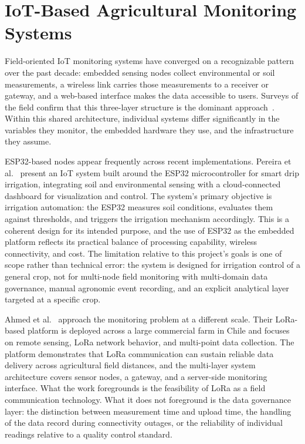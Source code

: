 \section{IoT-Based Agricultural Monitoring Systems}
\label{sec:iot-monitoring-systems}

Field-oriented IoT monitoring systems have converged on a recognizable pattern
over the past decade: embedded sensing nodes collect environmental or soil
measurements, a wireless link carries those measurements to a receiver or
gateway, and a web-based interface makes the data accessible to users.
Surveys of the field confirm that this three-layer structure is the dominant
approach~\cite{ayaz2019iot_smart_agriculture_survey,farooq2019iot_smart_agriculture_review}.
Within this shared architecture, individual systems differ significantly in
the variables they monitor, the embedded hardware they use, and the
infrastructure they assume.

ESP32-based nodes appear frequently across recent implementations. Pereira et
al.~\cite{pereira2023esp32_drip_irrigation} present an IoT system built around
the ESP32 microcontroller for smart drip irrigation, integrating soil and
environmental sensing with a cloud-connected dashboard for visualization and
control. The system's primary objective is irrigation automation: the ESP32
measures soil conditions, evaluates them against thresholds, and triggers the
irrigation mechanism accordingly. This is a coherent design for its intended
purpose, and the use of ESP32 as the embedded platform reflects its practical
balance of processing capability, wireless connectivity, and cost. The
limitation relative to this project's goals is one of scope rather than
technical error: the system is designed for irrigation control of a general
crop, not for multi-node field monitoring with multi-domain data governance,
manual agronomic event recording, and an explicit analytical layer targeted at
a specific crop.

Ahmed et al.~\cite{ahmed2022lora_agriculture_chile} approach the monitoring
problem at a different scale. Their LoRa-based platform is deployed across a
large commercial farm in Chile and focuses on remote sensing, LoRa network
behavior, and multi-point data collection. The platform demonstrates that LoRa
communication can sustain reliable data delivery across agricultural field
distances, and the multi-layer system architecture covers sensor nodes, a
gateway, and a server-side monitoring interface. What the work foregrounds is
the feasibility of LoRa as a field communication technology. What it does not
foreground is the data governance layer: the distinction between measurement
time and upload time, the handling of the data record during connectivity
outages, or the reliability of individual readings relative to a quality
control standard.

